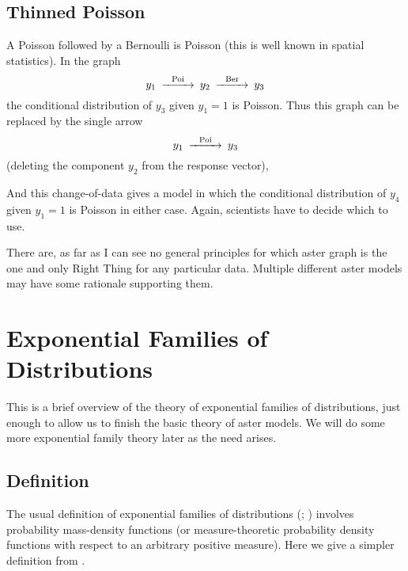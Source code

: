 \subsection{Thinned Poisson}

A Poisson followed by a Bernoulli is Poisson (this is well known in spatial
statistics).  In the graph
\begin{equation} \label{gr:poisson-bernoulli}
\begin{CD}
   y_1 @>\text{Poi}>> y_2 @>\text{Ber}>> y_3
\end{CD}
\end{equation}
the conditional distribution of $y_3$ given $y_1 = 1$ is Poisson.  Thus this
graph can be replaced by the single arrow
\begin{equation} \label{gr:poisson}
\begin{CD}
   y_1 @>\text{Poi}>> y_3
\end{CD}
\end{equation}
(deleting the component $y_2$ from the response vector),

And this change-of-data gives a model in which the conditional distribution
of $y_4$ given $y_1 = 1$ is Poisson in either case.
Again, scientists have to decide which to use.

There are, as far as I can see no general principles for which aster graph
is the one and only Right Thing for any particular data.  Multiple different
aster models may have some rationale supporting them.

\section{Exponential Families of Distributions}

This is a brief overview of the theory
of exponential families of distributions,
just enough to allow us to finish the basic theory of aster models.
We will do some more exponential family theory later as the need arises.

\subsection{Definition}
\label{sec:define-expfam}

The usual definition of exponential families of distributions
(\citealp[Chapter~8]{barndorff-nielsen}; \citealp[Chapter~1]{brown})
involves probability mass-density functions (or measure-theoretic probability
density functions with respect to an arbitrary positive measure).
Here we give a simpler definition from \citet{geyer-gdor}.

